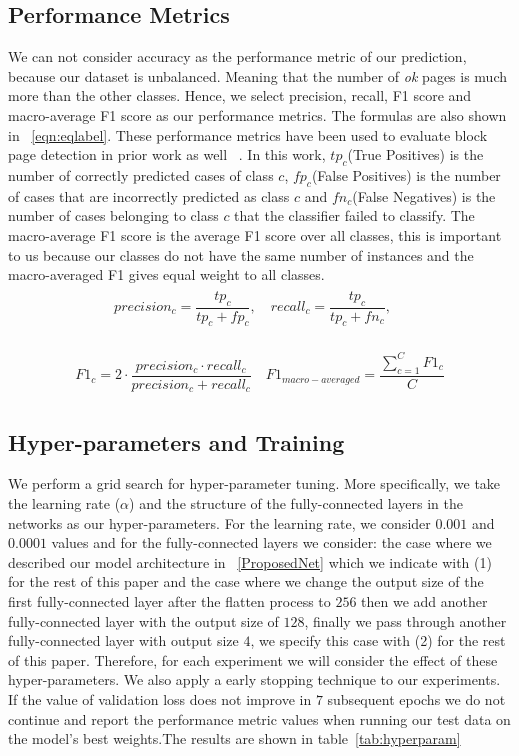\documentclass{article} %
\begin{document}
\subsection{Performance Metrics}
We can not consider accuracy as the performance metric of our prediction, because our dataset is unbalanced. Meaning that the number of \textit{ok} pages is much more than the other classes. Hence, we select precision, recall, F1 score and macro-average F1 score as our performance metrics. The formulas are also shown in ~\ref{eqn:eqlabel}. These performance metrics have been used to evaluate block page detection in prior work as well ~\cite{imc14_phillipa}. In this work, $tp_c$(True Positives) is the number of correctly predicted cases of class $c$, $fp_c$(False Positives) is the number of cases that are incorrectly predicted as class $c$ and $fn_c$(False Negatives) is the number of cases belonging to class $c$ that the classifier failed to classify. The macro-average F1 score is the average F1 score over all classes, this is important to us because our classes do not have the same number of instances and the macro-averaged F1 gives equal weight to all classes.
 \begin{align}
\label{eqn:eqlabel}
\begin{split}
 precision_c = \dfrac{tp_c}{tp_c+fp_c} , \quad 
recall_c = \dfrac{tp_c}{tp_c+fn_c}, \quad 
\end{split}
\end{align}


 \begin{align}
\label{eqn:eqlabel2}
\begin{split}
F1_c = 2 \cdot \dfrac{precision_c \cdot recall_c}{precision_c + recall_c} \quad
F1_{macro-averaged} = \dfrac{\sum_{c=1}^{C} F1_c}{C}
\end{split}
\end{align}



\subsection{Hyper-parameters and Training}
We perform a grid search for hyper-parameter tuning. More specifically, we take the learning rate ($\alpha$) and the structure of the fully-connected layers in the networks as our hyper-parameters. For the learning rate, we consider $0.001$ and $0.0001$ values and for the fully-connected layers we consider: the case where we described our model architecture in ~\ref{ProposedNet} which we indicate with (1) for the rest of this paper and the case where we change the output size of the first fully-connected layer after the flatten process to $256$ then we add another fully-connected layer with the output size of $128$, finally we pass through another fully-connected layer with output size $4$, we specify this case with (2) for the rest of this paper. Therefore, for each experiment we will consider the effect of these hyper-parameters. We also apply a early stopping technique to our experiments. If the value of validation loss does not improve in $7$ subsequent epochs we do not continue and report the performance metric values when running our test data on the model's best weights.The results are shown in table~\ref{tab:hyperparam}
\end{document}
